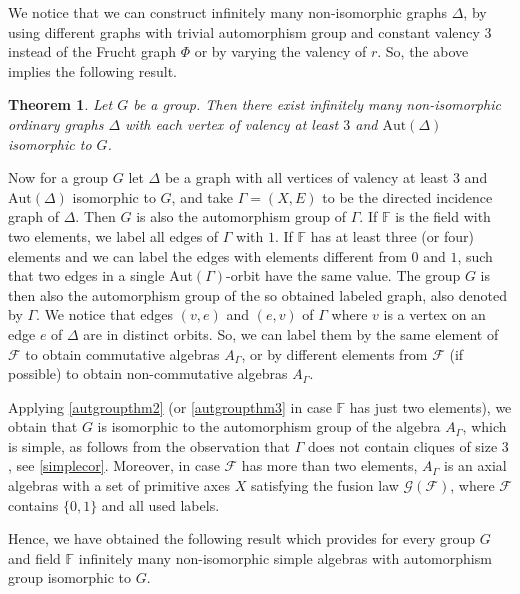 \documentclass[oneside,a4paper]{amsart} %
\newtheorem{theorem}[proposition]{Theorem}
\theoremstyle{definition}
\begin{document}
We notice that we can  construct infinitely many non-isomorphic graphs $\Delta$, by using different graphs with trivial automorphism group
and constant valency $3$ instead of the Frucht graph $\Phi$ or by varying the valency of $r$.  
So, the above implies the following result.

\begin{theorem}
Let $G$ be a group. Then there exist infinitely many non-isomorphic ordinary graphs $\Delta$ with
each vertex of valency at least $3$ and $\mathrm{Aut}(\Delta)$ isomorphic to $G$.
\end{theorem}

Now for a group $G$ let $\Delta$ be a graph with all vertices of valency at least $3$ and $\mathrm{Aut}(\Delta)$ isomorphic to
$G$, and take $\Gamma=(X,E)$ to be the directed incidence graph of $\Delta$. Then $G$ is also the automorphism group of $\Gamma$.
If $\mathbb{F}$ is the field with two elements, we label all edges of $\Gamma$ with $1$.
If $\mathbb{F}$ has at least three (or four) elements and we
can label the edges with elements different from $0$ and $1$, such that two edges in a single $\mathrm{Aut}(\Gamma)$-orbit have the same value. 
The group $G$ is then also the automorphism group of the so obtained labeled graph, also denoted by $\Gamma$.
We notice that edges $(v,e)$ and $(e,v)$ of $\Gamma$
where $v$ is a vertex on an edge $e$ of $\Delta$ are in distinct orbits. So, we can label them by the same element of $\mathcal{F}$ to obtain
commutative algebras $A_{\Gamma}$, or by different elements from $\mathcal{F}$ (if possible) to obtain non-commutative algebras $A_{\Gamma}$.

Applying \cref{autgroupthm2} (or \cref{autgroupthm3} in case $\mathbb{F}$ has just two elements),
we obtain that $G$ is isomorphic to the automorphism group of the algebra $A_{\Gamma}$,
which is simple, as follows from the observation that  $\Gamma$ does not contain cliques of size $3$, see \cref{simplecor}.
Moreover, in case $\mathcal{F}$ has more than two elements,  $A_\Gamma$ is an axial algebras with a set of primitive axes $X$ 
satisfying the fusion law $\mathcal{G}(\mathcal{F})$, where $\mathcal{F}$ contains $\{0,1\}$ and  all used labels.

Hence, we have obtained the following result which provides for every group $G$ and  field $\mathbb{F}$ infinitely many non-isomorphic simple algebras with automorphism group 
isomorphic to $G$.
\end{document}
